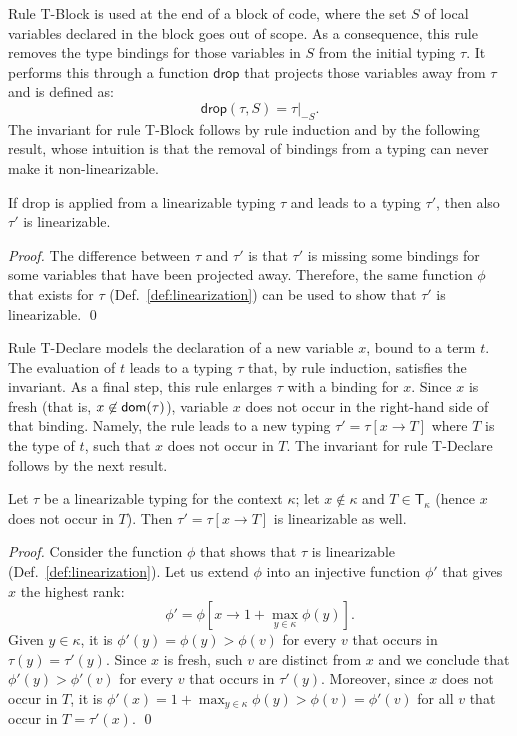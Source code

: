 Rule \textsf{T-Block} is used at the end of a block of code, where the set $S$ of local
variables declared in the block goes out of scope. As a consequence, this rule removes
the type bindings for those variables in $S$ from the initial typing $\tau$. It performs this
through a function $\mathsf{drop}$ that projects those variables away from $\tau$ and is defined as:
\[
\mathsf{drop}(\tau,S)=\tau|_{-S}.
\]
The invariant for rule \textsf{T-Block} follows by rule induction and by the following result,
whose intuition is that the removal of bindings from a typing can never make it
non-linearizable.
%
\begin{lemma}\label{lem:drop_invariant}
  If \textsf{drop} is applied from a linearizable typing $\tau$
  and leads to a typing $\tau'$, then also $\tau'$ is linearizable.
\end{lemma}
\begin{proof}
  The difference between $\tau$ and $\tau'$ is that $\tau'$ is missing some
  bindings for some variables that have been projected away. Therefore,
  the same function $\phi$ that exists for $\tau$ (Def.~\ref{def:linearization})
  can be used to show that $\tau'$ is linearizable.
  \qed
\end{proof}

Rule \textsf{T-Declare} models the declaration of a new variable $x$,
bound to a term $t$. The evaluation of $t$ leads to a typing $\tau$ that, by rule induction,
satisfies the invariant. As a final step, this rule
enlarges $\tau$ with a binding for $x$. Since $x$ is
fresh (that is, $x\not\in\mathsf{dom}(\tau)$),
variable $x$ does not occur in the right-hand side of that binding. Namely, the rule
leads to a new typing $\tau'=\tau[x\to T]$ where $T$ is the type of $t$, such that
$x$ does not occur in $T$. The invariant for rule \textsf{T-Declare} follows by the next result.

\begin{lemma}\label{lem:declare_invariant}
  Let $\tau$ be a linearizable typing for the context $\kappa$;
  let $x\not\in\kappa$ and $T\in\mathsf{T}_\kappa$ (hence $x$ does not occur in $T$).
  Then $\tau'=\tau[x\to T]$ is linearizable as well.
\end{lemma}
\begin{proof}
  Consider the function $\phi$ that shows that $\tau$ is linearizable (Def.~\ref{def:linearization}).
  Let us extend $\phi$ into an injective function $\phi'$ that gives $x$ the highest rank:
  \[
  \phi'=\phi\left[x\to 1+\max\limits_{y\in\kappa}\phi(y)\right].
  \]
  Given $y\in\kappa$, it is $\phi'(y)=\phi(y)>\phi(v)$ for every $v$ that occurs
  in $\tau(y)=\tau'(y)$. Since $x$ is fresh, such $v$ are distinct from $x$ and we
  conclude that $\phi'(y)>\phi'(v)$ for every $v$ that occurs in $\tau'(y)$.
  Moreover, since $x$ does not occur in $T$, it is
  $\phi'(x)=1+\max_{y\in\kappa}\phi(y)>\phi(v)=\phi'(v)$ for all $v$ that occur in $T=\tau'(x)$.
  \qed
\end{proof}

